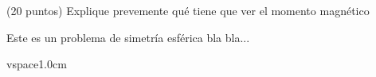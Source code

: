 \question [1] (20 puntos) Explique prevemente qué tiene que ver el momento magnético 

\begin{solution}
Este es un problema de simetría esférica bla bla...



\end{solution}

vspace{1.0cm}